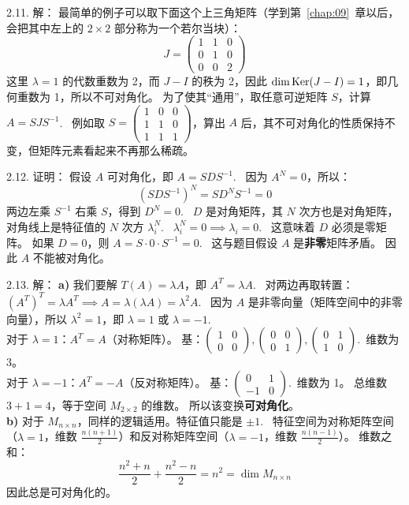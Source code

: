 \begin{exer}
2.11. 解：
最简单的例子可以取下面这个上三角矩阵（学到第~\ref{chap:09}~章以后，会把其中左上的 $2\times2$ 部分称为一个若尔当块）：
$$ J = \begin{pmatrix} 1 & 1 & 0 \\ 0 & 1 & 0 \\ 0 & 0 & 2 \end{pmatrix} $$
这里 $\lambda=1$ 的代数重数为 2，而 $J-I$ 的秩为 2，因此 $\dim\operatorname{Ker}(J-I)=1$，即几何重数为 1，所以不可对角化。
为了使其“通用”，取任意可逆矩阵 $S$，计算 $A = S J S^{-1}$.~
例如取 $S = \begin{pmatrix} 1 & 0 & 0 \\ 1 & 1 & 0 \\ 1 & 1 & 1 \end{pmatrix}$，算出 $A$ 后，其不可对角化的性质保持不变，但矩阵元素看起来不再那么稀疏。

2.12. 证明：
假设 $A$ 可对角化，即 $A = SDS^{-1}$.~
因为 $A^N = 0$，所以：
$$ (SDS^{-1})^N = S D^N S^{-1} = 0 $$
两边左乘 $S^{-1}$ 右乘 $S$，得到 $D^N = 0$.~
$D$ 是对角矩阵，其 $N$ 次方也是对角矩阵，对角线上是特征值的 $N$ 次方 $\lambda_i^N$.~
$\lambda_i^N = 0 \implies \lambda_i = 0$.~
这意味着 $D$ 必须是零矩阵。
如果 $D = 0$，则 $A = S \cdot 0 \cdot S^{-1} = 0$.~
这与题目假设 $A$ 是\textbf{非零}矩阵矛盾。
因此 $A$ 不能被对角化。

2.13. 解：
\textbf{a)}
我们要解 $T(A) = \lambda A$，即 $A^T = \lambda A$.~
对两边再取转置：$(A^T)^T = \lambda A^T \implies A = \lambda (\lambda A) = \lambda^2 A$.~
因为 $A$ 是非零向量（矩阵空间中的非零向量），所以 $\lambda^2 = 1$，即 $\lambda = 1$ 或 $\lambda = -1$.~\\
对于 $\lambda = 1$：$A^T = A$（对称矩阵）。
  基：$\begin{pmatrix} 1 & 0 \\ 0 & 0 \end{pmatrix}, \begin{pmatrix} 0 & 0 \\ 0 & 1 \end{pmatrix}, \begin{pmatrix} 0 & 1 \\ 1 & 0 \end{pmatrix}$.~维数为 3。\\
对于 $\lambda = -1$：$A^T = -A$（反对称矩阵）。
  基：$\begin{pmatrix} 0 & 1 \\ -1 & 0 \end{pmatrix}$.~维数为 1。
总维数 $3+1=4$，等于空间 $M_{2 \times 2}$ 的维数。
所以该变换\textbf{可对角化}。
\\
\textbf{b)}
对于 $M_{n \times n}$，同样的逻辑适用。特征值只能是 $\pm 1$.~
特征空间为对称矩阵空间（$\lambda=1$，维数 $\frac{n(n+1)}{2}$）和反对称矩阵空间（$\lambda=-1$，维数 $\frac{n(n-1)}{2}$）。
维数之和：
$$ \frac{n^2+n}{2} + \frac{n^2-n}{2} = n^2 = \dim M_{n \times n} $$
因此总是可对角化的。


\end{exer}
